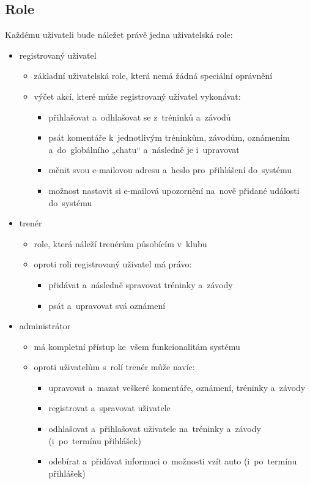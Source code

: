 \subsection{Role}
\label{section:role}
Každému uživateli bude náležet právě jedna uživatelská role:
\begin{itemize}
	\item registrovaný uživatel
	\begin{itemize}
		\item základní uživatelská role, která nemá žádná speciální oprávnění
		\item výčet akcí, které může registrovaný uživatel vykonávat:
		\begin{itemize}
			\item přihlašovat a~odhlašovat se z~tréninků a~závodů
			\item psát komentáře k~jednotlivým tréninkům, závodům, oznámením a~do~globálního „chatu“ a~následně je i~upravovat
			\item měnit svou e-mailovou adresu a~heslo pro~přihlášení do~systému
			\item možnost nastavit si e-mailová upozornění na~nově přidané události do~systému
		\end{itemize}
	\end{itemize}
	\item trenér
	\begin{itemize}
		\item role, která náleží trenérům působícím v~klubu
		\item oproti roli registrovaný uživatel má právo:
		\begin{itemize}
			\item přidávat a~následně spravovat tréninky a~závody
			\item psát a~upravovat svá oznámení
		\end{itemize}
	\end{itemize}
	\item administrátor
	\begin{itemize}
		\item má kompletní přístup ke~všem funkcionalitám systému
		\item oproti uživatelům s~rolí trenér může navíc:
		\begin{itemize}
			\item upravovat a~mazat veškeré komentáře, oznámení, tréninky a~závody
			\item registrovat a~spravovat uživatele
			\item odhlašovat a~přihlašovat uživatele na~tréninky a~závody (i~po~termínu přihlášek)
			\item odebírat a~přidávat informaci o~možnosti vzít auto (i~po~termínu přihlášek)
		\end{itemize}
	\end{itemize}
\end{itemize}
